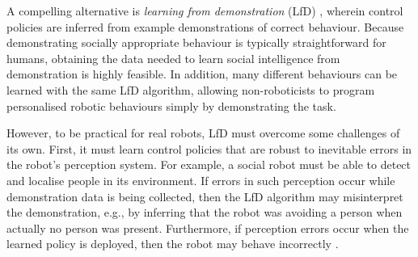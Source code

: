 \documentclass[letterpaper, 10 pt, conference]{ieeeconf}
\begin{document}

A compelling alternative is \emph{learning from demonstration} (LfD) \cite{argall2009survey}, wherein control policies are inferred from example demonstrations of correct behaviour.  Because demonstrating socially appropriate behaviour is typically straightforward for humans, obtaining the data needed to learn social intelligence from demonstration is highly feasible. In addition, many different behaviours can be learned with the same LfD algorithm, allowing non-roboticists to program personalised robotic behaviours simply by demonstrating the task.%


However, to be practical for real robots, LfD must overcome some challenges of its own.  First, it must learn control policies that are robust to inevitable errors in the robot's perception system.  For example, a social robot must be able to detect and localise people in its environment.  If errors in such perception occur while demonstration data is being collected, then the LfD algorithm may misinterpret the demonstration, e.g., by inferring that the robot was avoiding a person when actually no person was present.  Furthermore, if perception errors occur when the learned policy is deployed, then the robot may behave incorrectly \cite{dautenhahn2002imitation}.
\end{document}
